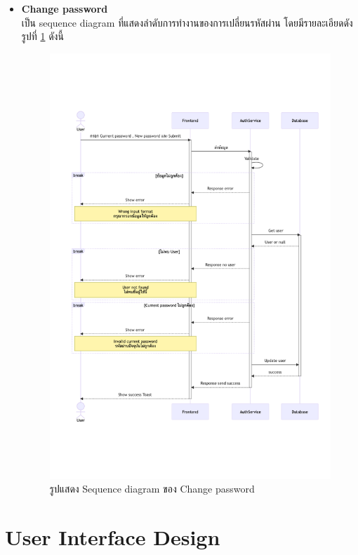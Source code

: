 \documentclass[12pt,oneside,openright,a4paper]{cpe-thai-project}
\begin{document}
\begin{itemize}
        
    \newpage
    \item \textbf{Change password}\\
    เป็น sequence diagram ที่แสดงลำดับการทำงานของการเปลี่ยนรหัสผ่าน โดยมีรายละเอียดดังรูปที่ \ref{fig:sqChangePassword} ดังนี้
    \begin{figure}[!ht]\centering
        \includegraphics[width=15cm, trim={1cm 5cm 0.5cm 5cm},clip]{./assets/sequence-diagram/change-password.png}
        \caption{รูปแสดง Sequence diagram ของ Change password}\label{fig:sqChangePassword}
    \end{figure}

    
\end{itemize}
\newpage
\section{User Interface Design}
\end{document}
